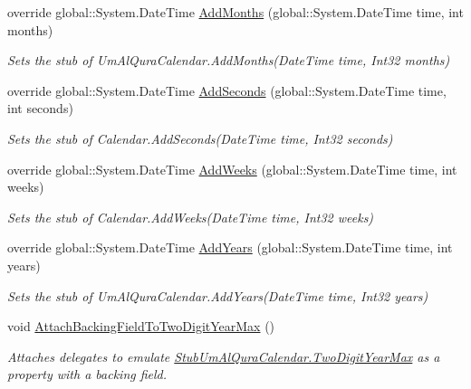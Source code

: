 \begin{DoxyCompactItemize}
override global\-::\-System.\-Date\-Time \hyperlink{class_system_1_1_globalization_1_1_fakes_1_1_stub_um_al_qura_calendar_a45f536e77693bb60f7b4c36f94dad007}{Add\-Months} (global\-::\-System.\-Date\-Time time, int months)
\begin{DoxyCompactList}\small\item\em Sets the stub of Um\-Al\-Qura\-Calendar.\-Add\-Months(\-Date\-Time time, Int32 months)\end{DoxyCompactList}\item 
override global\-::\-System.\-Date\-Time \hyperlink{class_system_1_1_globalization_1_1_fakes_1_1_stub_um_al_qura_calendar_a01e951ceb583541d1dbfa138eb72f954}{Add\-Seconds} (global\-::\-System.\-Date\-Time time, int seconds)
\begin{DoxyCompactList}\small\item\em Sets the stub of Calendar.\-Add\-Seconds(\-Date\-Time time, Int32 seconds)\end{DoxyCompactList}\item 
override global\-::\-System.\-Date\-Time \hyperlink{class_system_1_1_globalization_1_1_fakes_1_1_stub_um_al_qura_calendar_aea1f22fc770d9c4e53b5a8ac0ab82fcd}{Add\-Weeks} (global\-::\-System.\-Date\-Time time, int weeks)
\begin{DoxyCompactList}\small\item\em Sets the stub of Calendar.\-Add\-Weeks(\-Date\-Time time, Int32 weeks)\end{DoxyCompactList}\item 
override global\-::\-System.\-Date\-Time \hyperlink{class_system_1_1_globalization_1_1_fakes_1_1_stub_um_al_qura_calendar_a81147c361ed4c2e606d0776f504b9875}{Add\-Years} (global\-::\-System.\-Date\-Time time, int years)
\begin{DoxyCompactList}\small\item\em Sets the stub of Um\-Al\-Qura\-Calendar.\-Add\-Years(\-Date\-Time time, Int32 years)\end{DoxyCompactList}\item 
void \hyperlink{class_system_1_1_globalization_1_1_fakes_1_1_stub_um_al_qura_calendar_a6ea5897b5e338ef2bcdfb00faedf56be}{Attach\-Backing\-Field\-To\-Two\-Digit\-Year\-Max} ()
\begin{DoxyCompactList}\small\item\em Attaches delegates to emulate \hyperlink{class_system_1_1_globalization_1_1_fakes_1_1_stub_um_al_qura_calendar_a23dc9beb4cac8171f2ba886fdebaa9b6}{Stub\-Um\-Al\-Qura\-Calendar.\-Two\-Digit\-Year\-Max} as a property with a backing field.\end{DoxyCompactList}\item 

\end{DoxyCompactItemize}
